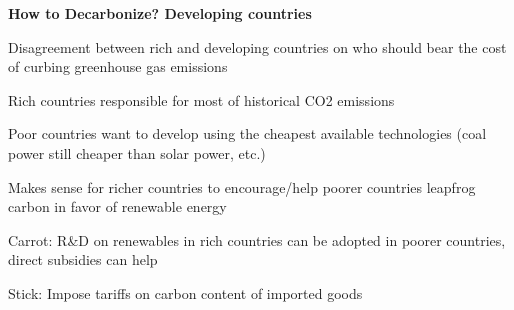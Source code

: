 \documentclass[landscape]{slides}
\begin{document}
\begin{slide}
\begin{center}
{\bf How to Decarbonize? Developing countries}
\end{center}
Disagreement between rich and developing countries on who should bear the cost of curbing greenhouse gas emissions

Rich countries responsible for most of historical CO2 emissions

Poor countries want to develop using the cheapest available technologies (coal power still cheaper than solar power, etc.)

Makes sense for richer countries to encourage/help poorer countries leapfrog carbon in favor of renewable energy

Carrot: R\&D on renewables in rich countries can be adopted in poorer countries, direct subsidies can help

Stick: Impose tariffs on carbon content of imported goods 







\end{slide}
\end{document}
